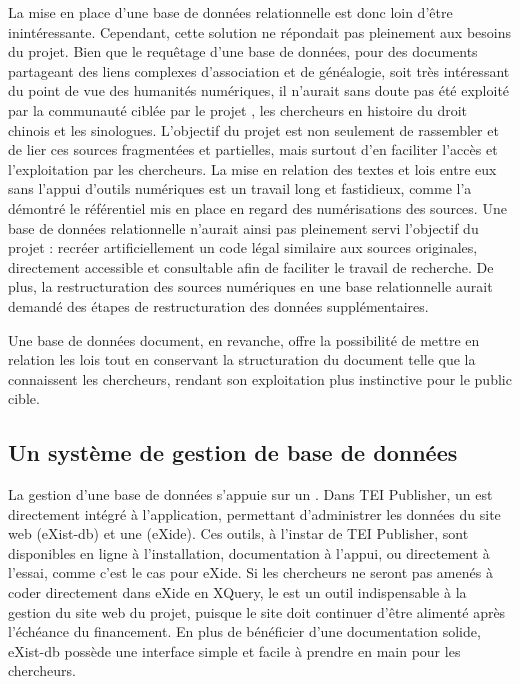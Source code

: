 La mise en place d'une base de données relationnelle est donc loin d'être inintéressante. Cependant, cette solution ne répondait pas pleinement aux besoins du projet. Bien que le requêtage d'une base de données, pour des documents partageant des liens complexes d'association et de généalogie, soit très intéressant du point de vue des humanités numériques, il n'aurait sans doute pas été exploité par la communauté ciblée par le projet \COREL, les chercheurs en histoire du droit chinois et les sinologues. L'objectif du projet est non seulement de rassembler et de lier ces sources fragmentées et partielles, mais surtout d'en faciliter l'accès et l'exploitation par les chercheurs. La mise en relation des textes et lois entre eux sans l'appui d'outils numériques est un travail long et fastidieux, comme l'a démontré le référentiel mis en place en regard des numérisations des sources. Une base de données relationnelle n'aurait ainsi pas pleinement servi l'objectif du projet : recréer artificiellement un code légal similaire aux sources originales, directement accessible et consultable afin de faciliter le travail de recherche. De plus, la restructuration des sources numériques en une base relationnelle aurait demandé des étapes de restructuration des données supplémentaires. 

Une base de données document, en revanche, offre la possibilité de mettre en relation les lois tout en conservant la structuration du document telle que la connaissent les chercheurs, rendant son exploitation plus instinctive pour le public cible. 

\subsection{Un système de gestion de base de données}

La gestion d'une base de données s'appuie sur un \SGBD. Dans TEI Publisher, un \SGBD est directement intégré à l'application, permettant d'administrer les données du site web (eXist-db) et une \IDE (eXide). Ces outils, à l'instar de TEI Publisher, sont disponibles en ligne à l'installation, documentation à l'appui, ou directement à l'essai, comme c'est le cas pour eXide. Si les chercheurs ne seront pas amenés à coder directement dans eXide en XQuery, le \SGBD est un outil indispensable à la gestion du site web du projet, puisque le site doit continuer d'être alimenté après l'échéance du financement. En plus de bénéficier d'une documentation solide, eXist-db possède une interface simple et facile à prendre en main pour les chercheurs.

